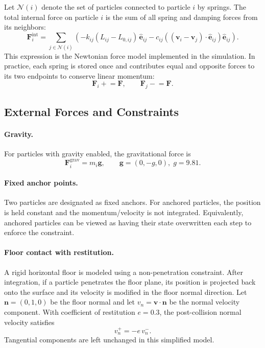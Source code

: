 \documentclass[manuscript,nonacm,12pt,letterpaper]{acmart}
\begin{document}
Let $\mathcal{N}(i)$ denote the set of particles connected to particle $i$ by springs. The total internal force on particle $i$ is the sum of all spring and damping forces from its neighbors:
\begin{equation}
\mathbf{F}_i^{\text{int}}
=
\sum_{j \in \mathcal{N}(i)}
\left(
-k_{ij}(L_{ij}-L_{0,ij})\,\hat{\mathbf{e}}_{ij}
-c_{ij}\left((\mathbf{v}_i-\mathbf{v}_j)\cdot \hat{\mathbf{e}}_{ij}\right)\hat{\mathbf{e}}_{ij}
\right).
\label{eq:newton_internal_force_sum}
\end{equation}
This expression is the Newtonian force model implemented in the simulation. In practice, each spring is stored once and contributes equal and opposite forces to its two endpoints to conserve linear momentum:
\[
\mathbf{F}_i \mathrel{+}= \mathbf{F}, \qquad \mathbf{F}_j \mathrel{-}= \mathbf{F}.
\]

\subsection{External Forces and Constraints}
\label{Sec4.5:External}

\paragraph{Gravity.}
For particles with gravity enabled, the gravitational force is
\begin{equation}
\mathbf{F}_i^{\text{grav}} = m_i \mathbf{g},
\qquad
\mathbf{g} = (0,-g,0), \; g = 9.81.
\label{eq:newton_gravity}
\end{equation}

\paragraph{Fixed anchor points.}
Two particles are designated as fixed anchors. For anchored particles, the position is held constant and the momentum/velocity is not integrated. Equivalently, anchored particles can be viewed as having their state overwritten each step to enforce the constraint.

\paragraph{Floor contact with restitution.}
A rigid horizontal floor is modeled using a non-penetration constraint. After integration, if a particle penetrates the floor plane, its position is projected back onto the surface and its velocity is modified in the floor normal direction. Let $\mathbf{n}=(0,1,0)$ be the floor normal and let $v_n = \mathbf{v}\cdot \mathbf{n}$ be the normal velocity component. With coefficient of restitution $e=0.3$, the post-collision normal velocity satisfies
\begin{equation}
v_n^{+} = -e\, v_n^{-}.
\label{eq:newton_restitution}
\end{equation}
Tangential components are left unchanged in this simplified model.
\end{document}
